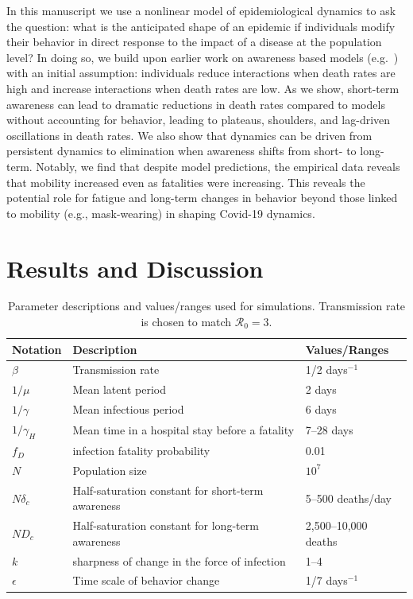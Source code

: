 In this manuscript we use a nonlinear model of epidemiological dynamics to
ask the question: what is the anticipated
shape of an epidemic if individuals modify their behavior in direct
response to the impact of a disease at the population level? In doing so,
we build upon earlier work on awareness based models (e.g.~\citep{funk2009spread,funk2010modelling,eksin2017disease, eksin2019systematic}) with an
initial assumption: individuals reduce interactions when 
death rates are high and increase interactions when death rates are low.  
As we show, short-term awareness can lead to dramatic reductions
in death rates compared to models without accounting for behavior,
leading to plateaus, shoulders,
and lag-driven oscillations in death rates. We also show that dynamics
can be driven from persistent dynamics to elimination when
awareness shifts from short- to long-term. Notably, we find
that despite model predictions, the empirical data reveals
that mobility increased even as fatalities were increasing. 
This reveals the potential role for fatigue and long-term
changes in behavior beyond those linked to mobility (e.g., mask-wearing)
in shaping Covid-19 dynamics.

\section{Results and Discussion}

\begin{table}[!h]
\begin{tabular}{l|p{3cm}|l}
\hline
Notation & Description & Values/Ranges\\
\hline
$\beta$ & Transmission rate & 1/2 days$^{-1}$ \\
$1/\mu$ & Mean latent period & 2 days \\
$1/\gamma$ & Mean infectious period & 6 days \\
$1/\gamma_H$ & Mean time in a hospital stay before a fatality & 7--28 days\\
$f_D$ & infection fatality probability & 0.01 \\
$N$ & Population size & $10^7$ \\
$N\delta_c$ & Half-saturation constant for short-term awareness & 5--500 deaths/day \\
$ND_c$ & Half-saturation constant for long-term awareness & 2,500--10,000 deaths \\
$k$ & sharpness of change in the force of infection & 1--4 \\
$\epsilon$ & Time scale of behavior change & 1/7 days$^{-1}$\\
\hline
\end{tabular}
\caption{
Parameter descriptions and values/ranges used for simulations. Transmission rate is chosen to match $\mathcal{R}_0 = 3$.
}
\end{table}

